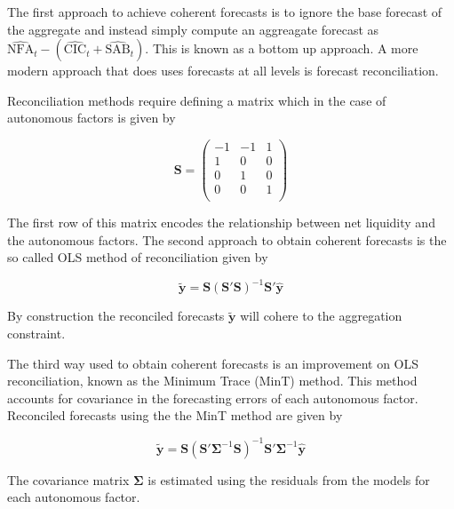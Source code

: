 The first approach to achieve coherent forecasts is to ignore the base forecast of the aggregate and instead simply compute an aggreagate forecast as 
$\hat{\textrm{NFA}}_t-(\hat{\textrm{CIC}}_t+\hat{\textrm{SAB}}_t)$. This is known as a bottom up approach. A more modern approach that does uses forecasts at all levels is forecast reconciliation.

Reconciliation methods require defining a matrix which in the case of autonomous factors is given by

\[
\mathbf{S}=\begin{pmatrix} -1 & -1 & 1\\
1 & 0 & 0\\
0 & 1 & 0\\
0 & 0 & 1\\
\end{pmatrix}
\]

The first row of this matrix encodes the relationship between net liquidity and the autonomous factors. The second approach to obtain coherent forecasts is the so called OLS method of reconciliation \citep{HynEtAl2011} given by

\[
\tilde{\mathbf{y}}=\mathbf{S}\left(\mathbf{S}'\mathbf{S}\right)^{-1}\mathbf{S}'\hat{\mathbf{y}}
\]

By construction the reconciled forecasts $\tilde{\mathbf{y}}$ will cohere to the aggregation constraint.

The third way used to obtain coherent forecasts is an improvement on OLS reconciliation, known as the Minimum Trace (MinT) method\citep{WicEtAl2019}.  This method accounts for covariance in the forecasting errors of each autonomous factor. Reconciled forecasts using the the MinT method are given by

\[
\tilde{\mathbf{y}}=\mathbf{S}\left(\mathbf{S}'\boldsymbol{\Sigma}^{-1}\mathbf{S}\right)^{-1}\mathbf{S}'\boldsymbol{\Sigma}^{-1}\hat{\mathbf{y}}
\]

The covariance matrix $\boldsymbol{\Sigma}$ is estimated using the residuals from the models for each autonomous factor.

